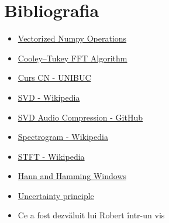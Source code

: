 \documentclass[12pt]{article}
\begin{document}
\newpage

\section{Bibliografia}

\begin{itemize}
    \item \href{https://www.pythonlikeyoumeanit.com/Module3_IntroducingNumpy/VectorizedOperations.html}{Vectorized Numpy Operations}
    \item \href{https://en.wikipedia.org/wiki/Cooley–Tukey_FFT_algorithm}{Cooley–Tukey FFT Algorithm}
    \item \href{https://numeric.cs.unibuc.ro/cn/cn-curs-6.pdf}{Curs CN - UNIBUC}
    \item \href{https://en.wikipedia.org/wiki/Singular_value_decomposition}{SVD - Wikipedia}
    \item \href{https://github.com/mich1803/SVD-Audio-Compression}{SVD Audio Compression - GitHub}
    \item \href{https://en.wikipedia.org/wiki/Spectrogram}{Spectrogram - Wikipedia}
    \item \href{https://en.wikipedia.org/wiki/Short-time_Fourier_transform}{STFT - Wikipedia}
    \item \href{https://en.wikipedia.org/wiki/Window_function#Hann_and_Hamming_windows}{Hann and Hamming Windows}
    \item \href{https://en.wikipedia.org/wiki/Uncertainty_principle}{Uncertainty principle}
    \item Ce a fost dezvăluit lui Robert într-un vis
\end{itemize}
\end{document}
